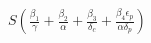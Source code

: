 \documentclass[preview]{standalone}
\begin{document}
\begin{center}
$S(\frac{\beta_1}{\gamma} + \frac{\beta_2}{\alpha} + \frac{\beta_3}{\delta_c} + \frac{\beta_4 \epsilon_p}{\alpha \delta_p})$
\end{center}
\end{document}
